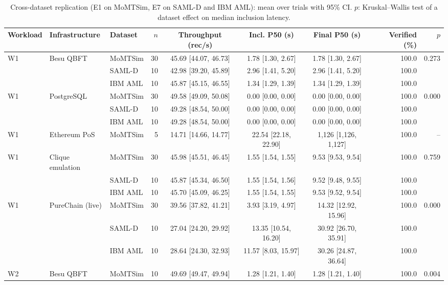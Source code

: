 \begin{table}[t]
\centering
\scriptsize
\caption{Cross-dataset replication (E1 on MoMTSim, E7 on SAML-D and IBM AML): mean over trials with 95\% CI. $p$: Kruskal--Wallis test of a dataset effect on median inclusion latency.}
\label{tab:datasets}
\begin{adjustbox}{max width=\textwidth}
\begin{tabular}{lllrcccrr}
\toprule
Workload & Infrastructure & Dataset & $n$ & Throughput (rec/s) & Incl. P50 (s) & Final P50 (s) & Verified (\%) & $p$ \\
\midrule
W1 & Besu QBFT & MoMTSim & 30 & 45.69 [44.07, 46.73] & 1.78 [1.30, 2.67] & 1.78 [1.30, 2.67] & 100.0 & 0.273 \\
 &  & SAML-D & 10 & 42.98 [39.20, 45.89] & 2.96 [1.41, 5.20] & 2.96 [1.41, 5.20] & 100.0 &  \\
 &  & IBM AML & 10 & 45.87 [45.15, 46.55] & 1.34 [1.29, 1.39] & 1.34 [1.29, 1.39] & 100.0 &  \\
W1 & PostgreSQL & MoMTSim & 30 & 49.58 [49.09, 50.08] & 0.00 [0.00, 0.00] & 0.00 [0.00, 0.00] & 100.0 & 0.000 \\
 &  & SAML-D & 10 & 49.28 [48.54, 50.00] & 0.00 [0.00, 0.00] & 0.00 [0.00, 0.00] & 100.0 &  \\
 &  & IBM AML & 10 & 49.28 [48.54, 50.00] & 0.00 [0.00, 0.00] & 0.00 [0.00, 0.00] & 100.0 &  \\
W1 & Ethereum PoS & MoMTSim & 5 & 14.71 [14.66, 14.77] & 22.54 [22.18, 22.90] & 1,126 [1,126, 1,127] & 100.0 & -- \\
W1 & Clique emulation & MoMTSim & 30 & 45.98 [45.51, 46.45] & 1.55 [1.54, 1.55] & 9.53 [9.53, 9.54] & 100.0 & 0.759 \\
 &  & SAML-D & 10 & 45.87 [45.34, 46.50] & 1.55 [1.54, 1.56] & 9.52 [9.48, 9.55] & 100.0 &  \\
 &  & IBM AML & 10 & 45.70 [45.09, 46.25] & 1.55 [1.54, 1.55] & 9.53 [9.52, 9.54] & 100.0 &  \\
W1 & PureChain (live) & MoMTSim & 30 & 39.56 [37.82, 41.21] & 3.93 [3.19, 4.97] & 14.32 [12.92, 15.96] & 100.0 & 0.000 \\
 &  & SAML-D & 10 & 27.04 [24.20, 29.92] & 13.35 [10.54, 16.20] & 30.92 [26.70, 35.91] & 100.0 &  \\
 &  & IBM AML & 10 & 28.64 [24.30, 32.93] & 11.57 [8.03, 15.97] & 30.26 [24.87, 36.64] & 100.0 &  \\
W2 & Besu QBFT & MoMTSim & 10 & 49.69 [49.47, 49.94] & 1.28 [1.21, 1.40] & 1.28 [1.21, 1.40] & 100.0 & 0.004 \\

\end{tabular}
\end{adjustbox}
\end{table}
